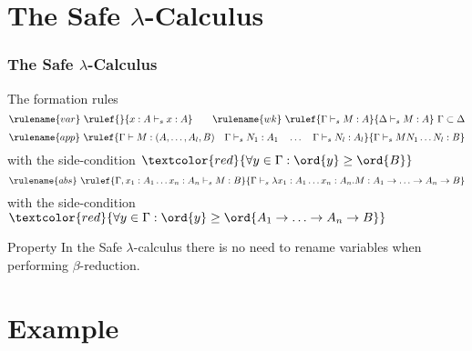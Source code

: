 \section{The Safe \texorpdfstring{$\lambda$}{Lambda}-Calculus}
\begin{frame} \frametitle{The Safe $\lambda$-Calculus}
\begin{block}{The formation rules}
$$ \rulename{var} \   \rulef{}{x : A\vdash_s x : A}
\qquad  \rulename{wk} \   \rulef{\Gamma \vdash_s M : A}{\Delta \vdash_s
M : A} \ \Gamma \subset \Delta$$
$$ \rulename{app} \  \rulef{\Gamma \vdash M : (A,\ldots,A_l,B)
                                        \quad \Gamma \vdash_s N_1 : A_1
                                        \quad \ldots \quad \Gamma \vdash_s N_l : A_l  }
                                   {\Gamma  \vdash_s M N_1 \ldots N_l : B}$$
\hfill with the side-condition $\textcolor{red}{\forall y \in \Gamma
: \ord{y} \geq \ord{B}}$
$$ \rulename{abs} \   \rulef{\Gamma, x_1:A_1 \ldots x_n : A_n \vdash_s M : B}
                                   {\Gamma  \vdash_s \lambda x_1:A_1 \ldots x_n : A_n . M : A_1 \rightarrow \ldots \rightarrow A_n \rightarrow B}$$
\hfill with the side-condition $\textcolor{red}{\forall y \in \Gamma
: \ord{y} \geq \ord{A_1 \rightarrow \ldots \rightarrow A_n
\rightarrow B}}$
\end{block}
\pause
\begin{block}{Property}
In the Safe $\lambda$-calculus there is no need to rename variables when
performing $\beta$-reduction.
\end{block}
\end{frame}


\section{Example}


